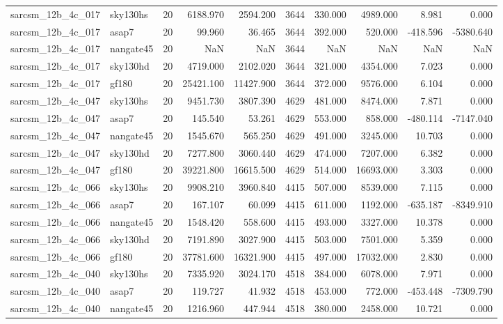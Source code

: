 \documentclass{article}
\begin{document}
\begin{longtable}{llrrrrrrrr}
sarcsm\_12b\_4c\_017 & sky130hs & 20 & 6188.970 & 2594.200 & 3644 & 330.000 & 4989.000 & 8.981 & 0.000 \\
sarcsm\_12b\_4c\_017 & asap7 & 20 & 99.960 & 36.465 & 3644 & 392.000 & 520.000 & -418.596 & -5380.640 \\
sarcsm\_12b\_4c\_017 & nangate45 & 20 & NaN & NaN & 3644 & NaN & NaN & NaN & NaN \\
sarcsm\_12b\_4c\_017 & sky130hd & 20 & 4719.000 & 2102.020 & 3644 & 321.000 & 4354.000 & 7.023 & 0.000 \\
sarcsm\_12b\_4c\_017 & gf180 & 20 & 25421.100 & 11427.900 & 3644 & 372.000 & 9576.000 & 6.104 & 0.000 \\
sarcsm\_12b\_4c\_047 & sky130hs & 20 & 9451.730 & 3807.390 & 4629 & 481.000 & 8474.000 & 7.871 & 0.000 \\
sarcsm\_12b\_4c\_047 & asap7 & 20 & 145.540 & 53.261 & 4629 & 553.000 & 858.000 & -480.114 & -7147.040 \\
sarcsm\_12b\_4c\_047 & nangate45 & 20 & 1545.670 & 565.250 & 4629 & 491.000 & 3245.000 & 10.703 & 0.000 \\
sarcsm\_12b\_4c\_047 & sky130hd & 20 & 7277.800 & 3060.440 & 4629 & 474.000 & 7207.000 & 6.382 & 0.000 \\
sarcsm\_12b\_4c\_047 & gf180 & 20 & 39221.800 & 16615.500 & 4629 & 514.000 & 16693.000 & 3.303 & 0.000 \\
sarcsm\_12b\_4c\_066 & sky130hs & 20 & 9908.210 & 3960.840 & 4415 & 507.000 & 8539.000 & 7.115 & 0.000 \\
sarcsm\_12b\_4c\_066 & asap7 & 20 & 167.107 & 60.099 & 4415 & 611.000 & 1192.000 & -635.187 & -8349.910 \\
sarcsm\_12b\_4c\_066 & nangate45 & 20 & 1548.420 & 558.600 & 4415 & 493.000 & 3327.000 & 10.378 & 0.000 \\
sarcsm\_12b\_4c\_066 & sky130hd & 20 & 7191.890 & 3027.900 & 4415 & 503.000 & 7501.000 & 5.359 & 0.000 \\
sarcsm\_12b\_4c\_066 & gf180 & 20 & 37781.600 & 16321.900 & 4415 & 497.000 & 17032.000 & 2.830 & 0.000 \\
sarcsm\_12b\_4c\_040 & sky130hs & 20 & 7335.920 & 3024.170 & 4518 & 384.000 & 6078.000 & 7.971 & 0.000 \\
sarcsm\_12b\_4c\_040 & asap7 & 20 & 119.727 & 41.932 & 4518 & 453.000 & 772.000 & -453.448 & -7309.790 \\
sarcsm\_12b\_4c\_040 & nangate45 & 20 & 1216.960 & 447.944 & 4518 & 380.000 & 2458.000 & 10.721 & 0.000 \\

\end{longtable}
\end{document}
